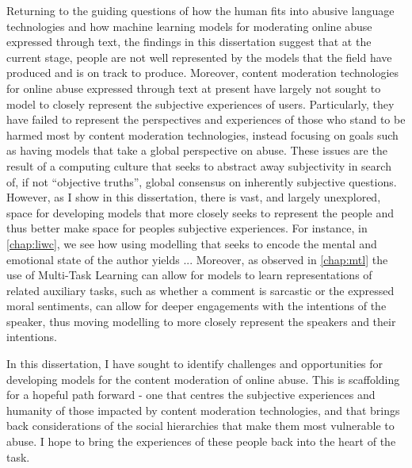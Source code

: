 %
Returning to the guiding questions of how the human fits into abusive language technologies and how machine learning models for moderating online abuse expressed through text, the findings in this dissertation suggest that at the current stage, people are not well represented by the models that the field have produced and is on track to produce.
Moreover, content moderation technologies for online abuse expressed through text at present have largely not sought to model to closely represent the subjective experiences of users.
Particularly, they have failed to represent the perspectives and experiences of those who stand to be harmed most by content moderation technologies, instead focusing on goals such as having models that take a global perspective on abuse.
These issues are the result of a computing culture that seeks to abstract away subjectivity in search of, if not ``objective truths'', global consensus on inherently subjective questions.
However, as I show in this dissertation, there is vast, and largely unexplored, space for developing models that more closely seeks to represent the people and thus better make space for peoples subjective experiences.
For instance, in \cref{chap:liwc}, we see how using modelling that seeks to encode the mental and emotional state of the author yields ... %
Moreover, as observed in \cref{chap:mtl} the use of Multi-Task Learning can allow for models to learn representations of related auxiliary tasks, such as whether a comment is sarcastic or the expressed moral sentiments, can allow for deeper engagements with the intentions of the speaker, thus moving modelling to more closely represent the speakers and their intentions.

In this dissertation, I have sought to identify challenges and opportunities for developing models for the content moderation of online abuse. This is scaffolding for a hopeful path forward - one that centres the subjective experiences and humanity of those impacted by content moderation technologies,  and that brings back considerations of the social hierarchies that make them most vulnerable to abuse.
I hope to bring the experiences of these people back into the heart of the task.
